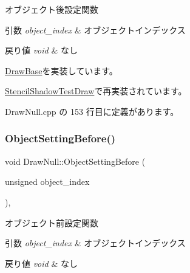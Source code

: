 オブジェクト後設定関数 


\begin{DoxyParams}{引数}
{\em object\+\_\+index} & オブジェクトインデックス \\
\hline
\end{DoxyParams}

\begin{DoxyRetVals}{戻り値}
{\em void} & なし \\
\hline
\end{DoxyRetVals}


\mbox{\hyperlink{class_draw_base_ab1592d0f04fb49289758008dcff4e7a0}{Draw\+Base}}を実装しています。



\mbox{\hyperlink{class_stencil_shadow_test_draw_a11fa9d700ca8db585b6f0b0be779d1ab}{Stencil\+Shadow\+Test\+Draw}}で再実装されています。



 Draw\+Null.\+cpp の 153 行目に定義があります。

\mbox{\label{class_draw_null_ac79a0adfc83537d5e677851463bb3028}} 
\subsubsection{\texorpdfstring{Object\+Setting\+Before()}{ObjectSettingBefore()}}
{\footnotesize\ttfamily void Draw\+Null\+::\+Object\+Setting\+Before (\begin{DoxyParamCaption}\item[{unsigned}]{object\+\_\+index }\end{DoxyParamCaption})\hspace{0.3cm}{\ttfamily [override]}, {\ttfamily [virtual]}}



オブジェクト前設定関数 


\begin{DoxyParams}{引数}
{\em object\+\_\+index} & オブジェクトインデックス \\
\hline
\end{DoxyParams}

\begin{DoxyRetVals}{戻り値}
{\em void} & なし \\
\hline
\end{DoxyRetVals}


